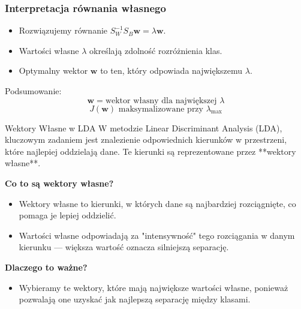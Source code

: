 \documentclass{beamer}
\begin{document}
\begin{frame}
    \frametitle{Interpretacja równania własnego}
    \begin{itemize}
        \item Rozwiązujemy równanie \( S_W^{-1} S_B \mathbf{w} = \lambda \mathbf{w} \).
        \item Wartości własne \(\lambda\) określają zdolność rozróżnienia klas.
        \item Optymalny wektor \(\mathbf{w}\) to ten, który odpowiada największemu \(\lambda\).
    \end{itemize}
    Podsumowanie:
    \[
    \mathbf{w} = \text{wektor własny dla największej } \lambda
    \]
    \[
    J(\mathbf{w}) \text{ maksymalizowane przy } \lambda_{\text{max}}
    \]
\end{frame}



\begin{frame}{Wektory Własne w LDA}
    W metodzie Linear Discriminant Analysis (LDA), kluczowym zadaniem jest znalezienie odpowiednich kierunków w przestrzeni, które najlepiej oddzielają dane.
    Te kierunki są reprezentowane przez **wektory własne**.

    \bigskip
    \textbf{Co to są wektory własne?}  
    \begin{itemize}
        \item Wektory własne to kierunki, w których dane są najbardziej rozciągnięte, co pomaga je lepiej oddzielić.
        \item Wartości własne odpowiadają za "intensywność" tego rozciągania w danym kierunku — większa wartość oznacza silniejszą separację.
    \end{itemize}

    \bigskip
    \textbf{Dlaczego to ważne?}  
    \begin{itemize}
        \item Wybieramy te wektory, które mają największe wartości własne, ponieważ pozwalają one uzyskać jak najlepszą separację między klasami.
    \end{itemize}
\end{frame}
\end{document}
